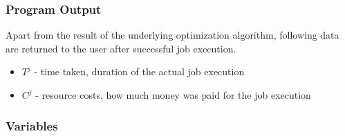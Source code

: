 \subsubsection{Program Output}
Apart from the result of the underlying optimization algorithm,
following data are returned to the user after successful job execution.

\begin{itemize}
    \item $T^{j}$ - time taken, duration of the actual job execution
    \item $C^{j}$ - resource costs, how much money was paid for the job execution
\end{itemize}

\subsubsection{Variables}

